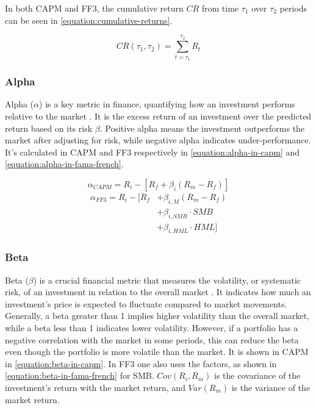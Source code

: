 In both CAPM and FF3, the cumulative return $CR$ from time $\tau_1$ over $\tau_2$ periods can be seen in \autoref{equation:cumulative-returns}. 

\vspace{-1em}
\begin{equation}
\label{equation:cumulative-returns}
    CR(\tau_1, \tau_2) = \sum_{t=\tau_1}^{\tau_2} R_t
\end{equation}

\subsubsection{Alpha}

Alpha ($\alpha$) is a key metric in finance, quantifying how an investment performs relative to the market \parencite{sharpe-capital-asset-prices}. It is the excess return of an investment over the predicted return based on its risk $\beta$. Positive alpha means the investment outperforms the market after adjusting for risk, while negative alpha indicates under-performance. It's calculated in CAPM and FF3 respectively in \autoref{equation:alpha-in-capm} and \autoref{equation:alpha-in-fama-french}.

\vspace{-1em}
\begin{equation}
\label{equation:alpha-in-capm}
    \alpha_{CAPM} = R_i - [R_f + \beta_i (R_m - R_f)]
\end{equation}
\begin{equation}
\label{equation:alpha-in-fama-french}
\begin{split}
    \alpha_{FF3} = R_i - [R_f &+ \beta_{i,M} (R_m - R_f) \\
    &+ \beta_{i,SMB} \cdot SMB \\
    &+ \beta_{i,HML} \cdot HML]
\end{split}
\end{equation}

\subsubsection{Beta}

Beta ($\beta$) is a crucial financial metric that measures the volatility, or systematic risk, of an investment in relation to the overall market \parencite{sharpe-capital-asset-prices}. It indicates how much an investment's price is expected to fluctuate compared to market movements. Generally, a beta greater than 1 implies higher volatility than the overall market, while a beta less than 1 indicates lower volatility. However, if a portfolio has a negative correlation with the market in some periods, this can reduce the beta even though the portfolio is more volatile than the market. It is shown in CAPM in \autoref{equation:beta-in-capm}. In FF3 one also uses the factors, as shown in \autoref{equation:beta-in-fama-french} for SMB. $Cov(R_i, R_m)$ is the covariance of the investment's return with the market return, and  $Var(R_m)$ is the variance of the market return. 

